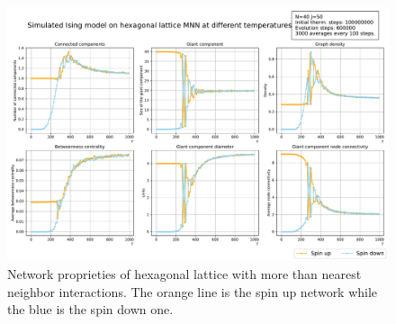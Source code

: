 \begin{figure}[H]
  \centering
  \includegraphics[width=\linewidth]{Network meausres/MNN_Hexa.pdf}
    \caption{Network proprieties of hexagonal lattice with more than nearest neighbor interactions. The orange line is the spin up network while the blue is the spin down one.}
    \label{Fig:MNN3}
\end{figure}
\newpage
